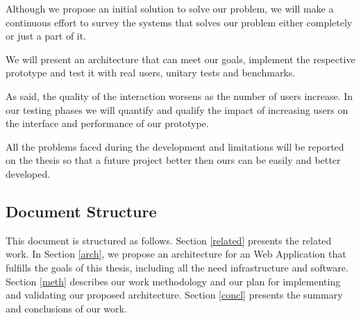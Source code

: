 
Although we propose an initial solution to solve our problem, we will make a continuous effort to survey the systems that solves our problem either completely or just a part of it.

We will present an architecture that can meet our goals, implement the respective prototype and test it with real users, unitary tests and benchmarks.

As \cite{geddes} said, the quality of the interaction worsens as the number of users increase. In our testing phases we will quantify and qualify the impact of increasing users on the interface and performance of our prototype. 

	All the problems faced during the development and limitations will be reported on the thesis so that a future project better then ours can be easily and better developed.

\subsection{Document Structure} %
This document is structured as follows. Section \ref{related} presents the related work.
	In Section \ref{arch}, we propose an architecture for an Web Application that fulfills the goals of this thesis, including all the need infrastructure and software.
	Section \ref{meth} describes our work methodology and our plan for implementing and validating our proposed architecture.
	Section \ref{concl} presents the summary and conclusions of our work.


